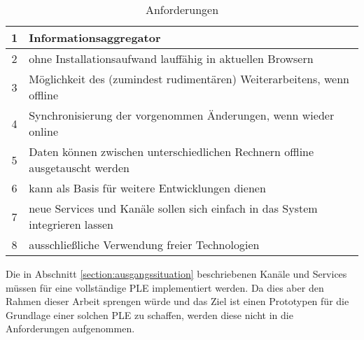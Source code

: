 \begin{table}[h]
\caption{Anforderungen}
\begin{tabular}{c || l}
1 & Informationsaggregator \\
\hline
2 & ohne Installationsaufwand lauffähig in aktuellen Browsern \\
\hline
3 & Möglichkeit des (zumindest rudimentären) Weiterarbeitens, wenn offline \\
\hline
4 & Synchronisierung der vorgenommen Änderungen, wenn wieder online \\
\hline
5 & Daten können zwischen unterschiedlichen Rechnern offline ausgetauscht werden \\
\hline
6 & kann als Basis für weitere Entwicklungen dienen\\
\hline
7 & neue Services und Kanäle sollen sich einfach in das System integrieren lassen  \\
\hline
8 & ausschließliche Verwendung freier Technologien \\
\hline
\end{tabular}
\label{table:anforderungen}
\end{table}

Die in Abschnitt \ref{section:ausgangssituation} beschriebenen Kanäle und Services müssen für eine vollständige PLE implementiert werden. Da dies aber den Rahmen dieser Arbeit sprengen würde und das Ziel ist einen Prototypen für die Grundlage einer solchen PLE zu schaffen, werden diese nicht in die Anforderungen aufgenommen.